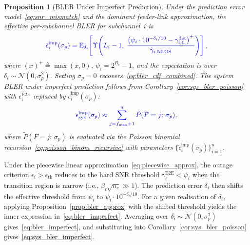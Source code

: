 \documentclass[lettersize,journal]{IEEEtran}
\newtheorem{proposition}{Proposition}
\providecommand{\DIFadd}[1]{{\protect\color{blue}#1}} %
\begin{document}
{\begin{proposition}[BLER Under Imperfect Prediction]
\label{prop:bler_imperfect}
\DIFadd{Under the prediction error model~\eqref{eq:snr_mismatch}
and the dominant feeder-link approximation,
the effective per-subchannel BLER for subchannel~$i$ is
}\begin{equation}
\DIFadd{\tilde{\epsilon}_i^{\mathrm{imp}}(\sigma_p)
= \mathbb{E}_{\delta_i}\!\left[
\Upsilon\!\left(L_i - 1,\;
\frac{\left(\psi_i\cdot 10^{-\delta_i/10}
  - \gamma_{i,0}^{\mathrm{det}}\right)^{+}}{\hat{\gamma}_{i,\mathrm{NLOS}}}\right)\right],
\label{eq:bler_imperfect}
}\end{equation}
\DIFadd{where $(x)^{+} \triangleq \max(x,0)$,
$\psi_i = 2^{R_c} - 1$, and the expectation is over
$\delta_i \sim \mathcal{N}(0, \sigma_p^2)$.
Setting $\sigma_p = 0$
recovers~\eqref{eq:bler_cdf_combined}.
The system BLER under imperfect prediction follows from
Corollary~\ref{cor:sys_bler_poisson} with
$\epsilon_i^{\mathrm{E2E}}$ replaced by
$\tilde{\epsilon}_i^{\mathrm{imp}}(\sigma_p)$:
}\begin{equation}
\DIFadd{\epsilon_{\mathrm{sys}}^{\mathrm{imp}}(\sigma_p)
\approx \sum_{j=f_{\max}+1}^{n}
\tilde{P}(F = j;\,\sigma_p),
\label{eq:sys_bler_imperfect}
}\end{equation}
\DIFadd{where $\tilde{P}(F = j;\,\sigma_p)$ is evaluated via the
Poisson binomial recursion~\eqref{eq:poisson_binom_recursive}
with parameters
$\{\tilde{\epsilon}_i^{\mathrm{imp}}(\sigma_p)\}_{i=1}^{n}$.
}\end{proposition}

\begin{IEEEproof}
\DIFadd{Under the piecewise linear approximation~\eqref{eq:piecewise_approx},
the outage criterion $\epsilon_i > \epsilon_{\mathrm{th}}$ reduces
to the hard SNR threshold $\gamma_i^{\mathrm{E2E}} < \psi_i$ when
the transition region is narrow (i.e., $\beta_i\sqrt{n_c} \gg 1$).
The prediction error $\delta_i$ then shifts the effective threshold
from $\psi_i$ to $\psi_i \cdot 10^{-\delta_i/10}$.
For a given realisation of $\delta_i$, applying
Proposition~\ref{prop:bler_approx} with the shifted threshold
yields the inner expression
in~\eqref{eq:bler_imperfect}.
Averaging over $\delta_i \sim \mathcal{N}(0,\sigma_p^2)$
gives~\eqref{eq:bler_imperfect}, and substituting into
Corollary~\ref{cor:sys_bler_poisson}
gives~\eqref{eq:sys_bler_imperfect}.
}\end{IEEEproof}

}
\end{document}
